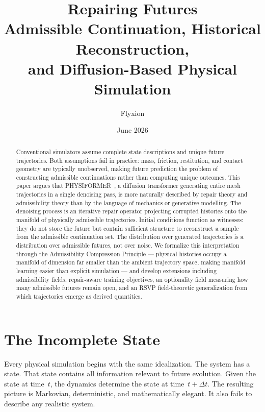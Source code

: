 \documentclass[12pt,oneside]{article}
\title{
{\LARGE\bfseries
Repairing Futures}\\[0.6em]
{\large
Admissible Continuation, Historical Reconstruction,\\
and Diffusion-Based Physical Simulation}
}
\author{Flyxion}
\date{June 2026}
\theoremstyle{definition}
\begin{document}
\maketitle

\begin{abstract}

Conventional simulators assume complete state descriptions and unique future
trajectories. Both assumptions fail in practice: mass, friction, restitution,
and contact geometry are typically unobserved, making future prediction the
problem of constructing admissible continuations rather than computing
unique outcomes. This paper argues that PHYSIFORMER~\cite{chen2026physiformer},
a diffusion transformer generating entire mesh trajectories in a single
denoising pass, is more naturally described by repair theory and admissibility
theory than by the language of mechanics or generative modelling. The denoising
process is an iterative repair operator projecting corrupted histories onto the
manifold of physically admissible trajectories. Initial conditions function as
witnesses: they do not store the future but contain sufficient structure to
reconstruct a sample from the admissible continuation set. The distribution
over generated trajectories is a distribution over admissible futures, not
over noise. We formalize this interpretation through the Admissibility
Compression Principle --- physical histories occupy a manifold of dimension
far smaller than the ambient trajectory space, making manifold learning easier
than explicit simulation --- and develop extensions including admissibility
fields, repair-aware training objectives, an optionality field measuring
how many admissible futures remain open, and an RSVP field-theoretic
generalization from which trajectories emerge as derived quantities.

\end{abstract}

\newpage

\section{The Incomplete State}

Every physical simulation begins with the same idealization. The system has a state. That
state contains all information relevant to future evolution. Given the state at time~\(t\),
the dynamics determine the state at time~\(t + \Delta t\). The resulting picture is
Markovian, deterministic, and mathematically elegant. It also fails to describe any
realistic system.
\end{document}
